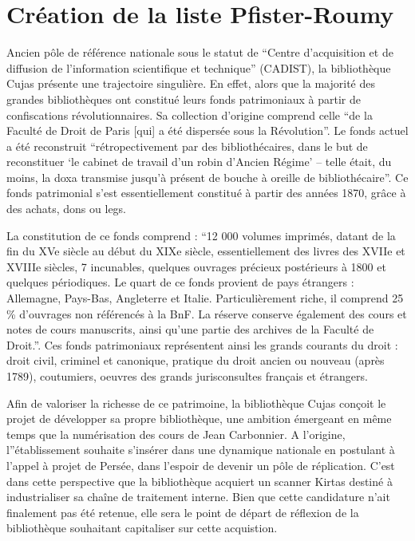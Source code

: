 \section[Pfister-Roumy]{Création de la liste Pfister-Roumy}

Ancien pôle de référence nationale sous le statut de \enquote{Centre d'acquisition et de diffusion de l'information scientifique et technique} (CADIST), la bibliothèque Cujas présente une trajectoire singulière. En effet, alors que la majorité des grandes bibliothèques ont constitué leurs fonds patrimoniaux à partir de confiscations révolutionnaires. Sa collection d'origine comprend celle \enquote{de la Faculté de Droit de Paris [qui] a été dispersée sous la Révolution}. Le fonds actuel a été reconstruit \enquote{rétropectivement par des bibliothécaires, dans le but de reconstituer \enquote{le cabinet de travail d'un robin d'Ancien Régime} -- telle était, du moins, la doxa transmise jusqu'à présent de bouche à oreille de bibliothécaire}. Ce fonds patrimonial s'est essentiellement constitué à partir des années 1870, grâce à des achats, dons ou legs. 

La constitution de ce fonds comprend : \enquote{12 000 volumes imprimés, datant de la fin du XVe siècle au début du XIXe siècle, essentiellement des livres des XVIIe et XVIIIe siècles, 7 incunables, quelques ouvrages précieux postérieurs à 1800 et quelques périodiques. Le quart de ce fonds provient de pays étrangers : Allemagne, Pays-Bas, Angleterre et Italie. Particulièrement riche, il comprend 25 \% d'ouvrages non référencés à la BnF. La réserve conserve également des cours et notes de cours manuscrits, ainsi qu'une partie des archives de la Faculté de Droit.}. Ces fonds patrimoniaux représentent ainsi les grands courants du droit : droit civil, criminel et canonique, pratique du droit ancien ou nouveau (après 1789), coutumiers, oeuvres des grands jurisconsultes français et étrangers.
	
Afin de valoriser la richesse de ce patrimoine, la bibliothèque Cujas conçoit le projet de développer sa propre bibliothèque, une ambition émergeant en même temps que la numérisation des cours de Jean Carbonnier. A l'origine, l''établissement souhaite s'insérer dans une dynamique nationale en postulant à l'appel à projet de Persée, dans l'espoir de devenir un pôle de réplication. C'est dans cette perspective que la bibliothèque acquiert un scanner Kirtas destiné à industrialiser sa chaîne de traitement interne. Bien que cette candidature n'ait finalement pas été retenue, elle sera le point de départ de réflexion de la bibliothèque souhaitant capitaliser sur cette  acquistion. 

